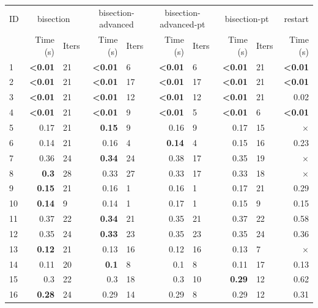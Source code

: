 \begin{longtable}{lr@{\hskip 4pt}l@{\hskip 12pt}r@{\hskip 4pt}l@{\hskip 12pt}r@{\hskip 4pt}l@{\hskip 12pt}r@{\hskip 4pt}l@{\hskip 12pt}r}
\toprule
ID & \multicolumn{2}{c}{bisection} & \multicolumn{2}{c}{bisection-advanced} & \multicolumn{2}{c}{bisection-advanced-pt} & \multicolumn{2}{c}{bisection-pt} & restart \\
\cmidrule(lr){2-3}\cmidrule(lr){4-5}\cmidrule(lr){6-7}\cmidrule(lr){8-9}\cmidrule(lr){10-10}
 & Time (s) &  Iters & Time (s) &  Iters & Time (s) &  Iters & Time (s) &  Iters & Time (s) \\
\midrule
\endhead
1 & \textbf{<0.01} & 21 & \textbf{<0.01} & 6 & \textbf{<0.01} & 6 & \textbf{<0.01} & 21 & \textbf{<0.01} \\
2 & \textbf{<0.01} & 21 & \textbf{<0.01} & 17 & \textbf{<0.01} & 17 & \textbf{<0.01} & 21 & \textbf{<0.01} \\
\cmidrule{2-10}
3 & \textbf{<0.01} & 21 & \textbf{<0.01} & 12 & \textbf{<0.01} & 12 & \textbf{<0.01} & 21 & 0.02 \\
4 & \textbf{<0.01} & 21 & \textbf{<0.01} & 9 & \textbf{<0.01} & 5 & \textbf{<0.01} & 6 & \textbf{<0.01} \\
\midrule
5 & 0.17 & 21 & \textbf{0.15} & 9 & 0.16 & 9 & 0.17 & 15 & $\times$ \\
6 & 0.14 & 21 & 0.16 & 4 & \textbf{0.14} & 4 & 0.15 & 16 & 0.23 \\
7 & 0.36 & 24 & \textbf{0.34} & 24 & 0.38 & 17 & 0.35 & 19 & $\times$ \\
8 & \textbf{0.3} & 28 & 0.33 & 27 & 0.33 & 17 & 0.33 & 18 & $\times$ \\
\cmidrule{2-10}
9 & \textbf{0.15} & 21 & 0.16 & 1 & 0.16 & 1 & 0.17 & 21 & 0.29 \\
10 & \textbf{0.14} & 9 & 0.14 & 1 & 0.17 & 1 & 0.15 & 9 & 0.15 \\
11 & 0.37 & 22 & \textbf{0.34} & 21 & 0.35 & 21 & 0.37 & 22 & 0.58 \\
12 & 0.35 & 24 & \textbf{0.33} & 23 & 0.35 & 23 & 0.35 & 24 & 0.36 \\
\cmidrule{2-10}
13 & \textbf{0.12} & 21 & 0.13 & 16 & 0.12 & 16 & 0.13 & 7 & $\times$ \\
14 & 0.11 & 20 & \textbf{0.1} & 8 & 0.1 & 8 & 0.11 & 17 & 0.13 \\
15 & 0.3 & 22 & 0.3 & 18 & 0.3 & 10 & \textbf{0.29} & 12 & 0.62 \\
16 & \textbf{0.28} & 24 & 0.29 & 14 & 0.29 & 8 & 0.29 & 12 & 0.31 \\
\cmidrule{2-10}

\end{longtable}
